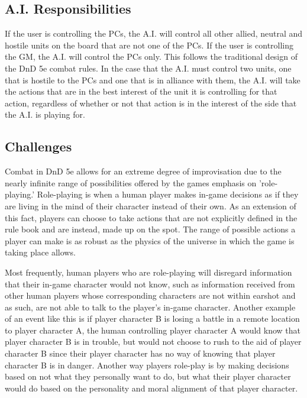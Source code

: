 \documentclass[12pt,a4paper]{report}
\begin{document}
		\subsection{A.I. Responsibilities}
		If the user is controlling the PCs, the A.I. will control all other allied, neutral and hostile units on the board that are not one of the PCs. If the user is controlling the GM, the A.I. will control the PCs only. This follows the traditional design of the DnD 5e combat rules. In the case that the A.I. must control two units, one that is hostile to the PCs and one that is in alliance with them, the A.I. will take the actions that are in the best interest of the unit it is controlling for that action, regardless of whether or not that action is in the interest of the side that the A.I. is playing for. 
		
		\subsection{Challenges}
		Combat in DnD 5e allows for an extreme degree of improvisation due to the nearly infinite range of possibilities offered by the games emphasis on 'role-playing.' Role-playing is when a human player makes in-game decisions as if they are living in the mind of their character instead of their own. As an extension of this fact, players can choose to take actions that are not explicitly defined in the rule book and are instead, made up on the spot. The range of possible actions a player can make is as robust as the physics of the universe in which the game is taking place allows. 
		
		Most frequently, human players who are role-playing will disregard information that their in-game character would not know, such as information received from other human players whose corresponding characters are not within earshot and as such, are not able to talk to the player's in-game character. Another example of an event like this is if player character B is losing a battle in a remote location to player character A, the human controlling player character A would know that player character B is in trouble, but would not choose to rush to the aid of player character B since their player character has no way of knowing that player character B is in danger. Another way players role-play is by making decisions based on not what they personally want to do, but what their player character would do based on the personality and moral alignment of that player character.
		
\end{document}
